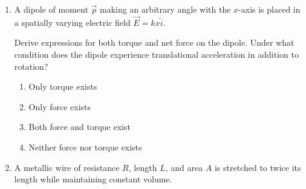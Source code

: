 \documentclass[12pt]{article}
\begin{document}
\begin{enumerate}
\begin{center}
\end{center}

\begin{enumerate}[label=\Alph*)]
\item Capacitance only
\item Charge on plates only
\item Electric field between plates
\item Potential difference across plates
\end{enumerate}

\item A dipole of moment $\vec p$ making an arbitrary angle with the $x$-axis is placed in a spatially varying electric field $\vec E = kx \hat i$.

Derive expressions for both torque and net force on the dipole. Under what condition does the dipole experience translational acceleration in addition to rotation?

\begin{enumerate}[label=\Alph*)]
\item Only torque exists
\item Only force exists
\item Both force and torque exist
\item Neither force nor torque exists
\end{enumerate}


\item A metallic wire of resistance $R$, length $L$, and area $A$ is stretched to twice its length while maintaining constant volume.


\end{enumerate}
\end{document}
